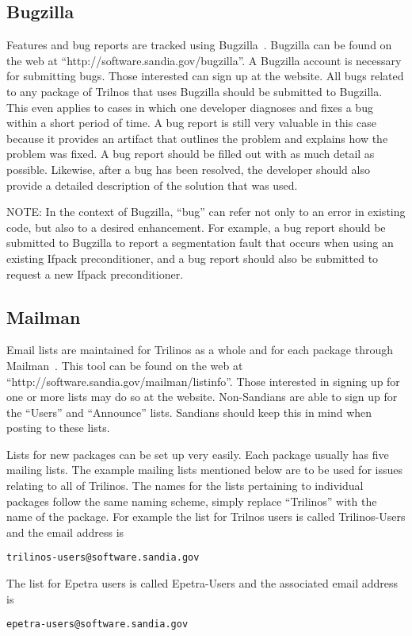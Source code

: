 \documentclass[12pt,relax]{SANDreport}
\begin{document}
\subsection{Bugzilla}

Features and bug reports are tracked using Bugzilla~\cite{Bugzilla}.  Bugzilla 
can be found on the web at ``http://software.sandia.gov/bugzilla''.  A 
Bugzilla account is necessary for submitting bugs.  Those interested can sign 
up at the website.  All bugs related to any package of Trilnos that uses 
Bugzilla should be submitted to Bugzilla.  This even applies to cases in which 
one developer diagnoses and fixes a bug within a short period of time.  A bug 
report is still very valuable in this case because it provides an artifact 
that outlines the problem and explains how the problem was fixed.  A bug 
report should be filled out with as much detail as possible.  Likewise, after 
a bug has been resolved, the developer should also provide a detailed 
description of the solution that was used.

NOTE: In the context of Bugzilla, ``bug'' can refer not only to an error in 
existing code, but also to a desired enhancement.  For example, a bug report 
should be submitted to Bugzilla to report a segmentation fault that occurs 
when using an existing Ifpack preconditioner, and a bug report should also be
submitted to request a new Ifpack preconditioner.

\subsection{Mailman}

Email lists are maintained for Trilinos as a whole and for each package 
through Mailman~\cite{Mailman}.  This tool can be found on the web at 
``http://software.sandia.gov/mailman/listinfo''.  Those interested in signing 
up for one or more lists may do so at the website.  Non-Sandians are able to 
sign up for the ``Users'' and ``Announce'' lists.  Sandians should keep this 
in mind when posting to these lists.

Lists for new packages can be set up very easily.  Each package usually has 
five mailing lists.  The example mailing lists mentioned below are to be used 
for issues relating to all of Trilinos.  The names for the lists pertaining to 
individual packages follow the same naming scheme, simply replace ``Trilinos'' 
with the name of the package.  For example the list for Trilnos users is 
called Trilinos-Users and the email address is 
\begin{verbatim}trilinos-users@software.sandia.gov\end{verbatim}  The list 
for Epetra users is called Epetra-Users and the associated email address is 
\begin{verbatim}epetra-users@software.sandia.gov\end{verbatim}
\end{document}
